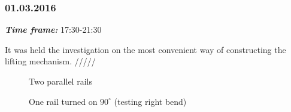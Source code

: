\subsubsection{01.03.2016}
\textit{\textbf{Time frame:}} 17:30-21:30 

It was held the investigation on the most convenient way of constructing the lifting mechanism. /////

\begin{figure}[H]
	\begin{minipage}[h]{0.47\linewidth}
		\caption{Two parallel rails}
		\label{Elevator4.1}
	\end{minipage}
	\hfill
	\begin{minipage}[h]{0.47\linewidth}
		\caption{One rail turned on $90^\circ$ (testing right bend)}
		\label{Elevator4.2}
	\end{minipage}

\end{figure}

